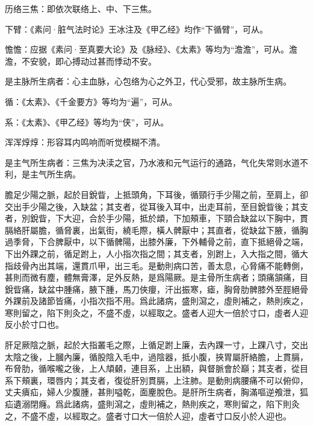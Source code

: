 \documentclass[12pt]{ctexbook}%
\begin{document}

\begin{jiaozhu}
  \item 历络三焦：即依次联络上、中、下三焦。
  \item 下臂：《素问·脏气法时论》王冰注及《甲乙经》均作“下循臂”，可从。
  \item 憺憺：应据《素问·至真要大论》及《脉经》、《太素》等均为“澹澹”，可从。澹澹，不安貌，即心搏动过甚而悸动不安。
  \item 是主脉所生病者：心主血脉，心包络为心之外卫，代心受邪，故主脉所生病。
  \item 循：《太素》、《千金要方》等均为“遍”，可从。
  \item 系：《太素》、《甲乙经》等均为“侠”，可从。
  \item 浑浑焞焞：形容耳内鸣响而听觉模糊不清。
  \item 是主气所生病者：三焦为决渎之官，乃水液和元气运行的通路，气化失常则水道不利，是主气所生病。
\end{jiaozhu}


\begin{yuanwen}
膽足少陽之脈，起於目銳眥，上抵頭角，下耳後，循頸行手少陽之前，至肩上，卻交出手少陽之後，入缺盆；其支者，從耳後入耳中，出走耳前，至目銳眥後；其支者，別銳眥，下大迎，合於手少陽，抵於䪼，下加頰車，下頸合缺盆以下胸中，貫膈絡肝屬膽，循脅裏，出氣街，繞毛際，橫人髀厭中；其直者，從缺盆下腋，循胸過季脅，下合脾厭中，以下循髀陽，出膝外廉，下外輔骨之前，直下抵絕骨之端，下出外踝之前，循足跗上，人小指次指之間；其支者，別跗上，入大指之間，循大指歧骨內出其端，還貫爪甲，出三毛。是動則病口苦，善太息，心脅痛不能轉側，甚則而微有塵，體無膏澤，足外反熱，是爲陽厥。是主骨所生病者；頭痛頷痛，目銳眥痛，缺盆中腫痛，腋下腫，馬刀俠癭，汗出振寒，瘧，胸脅肋髀膝外至脛絕骨外踝前及諸節皆痛，小指次指不用。爲此諸病，盛則瀉之，虛則補之，熱則疾之，寒則留之，陷下則灸之，不盛不虛，以經取之。盛者人迎大一倍於寸口，虛者人迎反小於寸口也。

肝足厥陰之脈，起於大指叢毛之際，上循足跗上廉，去內踝一寸，上踝八寸，交出太陰之後，上膕內廉，循股陰入毛中，過陰器，抵小腹，挾胃屬肝絡膽，上貫膈，布脅肋，循喉嚨之後，上人頏顙，連目系，上出額，與督脈會於巔；其支者，從目系下頰裏，環唇内；其支者，復從肝別貫膈，上注肺。是動則病腰痛不可以俯仰，丈夫㿉疝，婦人少腹腫，甚則嗌乾，面麈脫色。是肝所生病者，胸滿嘔逆飧泄，狐疝遺溺閉癃。爲此諸病，盛則瀉之，虛則補之，熱則疾之，寒則留之，陷下則灸之，不盛不虛，以經取之。盛者寸口大一倍於人迎，虛者寸口反小於人迎也。
\end{yuanwen}
\end{document}
